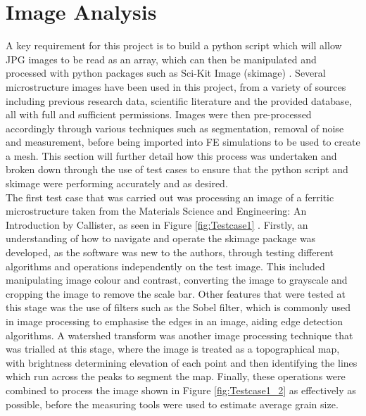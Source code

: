 \documentclass[\report.tex]{subfiles}
\begin{document}
\section{Image Analysis}
\noindent A key requirement for this project is to build a python script which will allow JPG images to be read as an array, which can then be manipulated and processed with python packages such as Sci-Kit Image (skimage) \cite{scikitimage}. Several microstructure images have been used in this project, from a variety of sources including previous research data, scientific literature and the provided database, all with full and sufficient permissions. Images were then pre-processed accordingly through various techniques such as segmentation, removal of noise and measurement, before being imported into FE simulations to be used to create a mesh. This section will further detail how this process was undertaken and broken down through the use of test cases to ensure that the python script and skimage were performing accurately and as desired.\\

\noindent The first test case that was carried out was processing an image of a ferritic microstructure taken from the Materials Science and Engineering: An Introduction by Callister, as seen in Figure \ref{fig:Testcase1} \cite{CallisterJrWilliamD2000MSaE}.
Firstly, an understanding of how to navigate and operate the skimage package was developed, as the software was new to the authors, through testing different algorithms and operations independently on the test image. This included manipulating image colour and contrast, converting the image to grayscale and cropping the image to remove the scale bar. Other features that were tested at this stage was the use of filters such as the Sobel filter, which is commonly used in image processing to emphasise the edges in an image, aiding edge detection algorithms.
A watershed transform was another image processing technique that was trialled at this stage, where the image is treated as a topographical map, with brightness determining elevation of each point and then identifying the lines which run across the peaks to segment the map. Finally, these operations were combined to process the image shown in Figure \ref{fig:Testcase1_2} as effectively as possible, before the measuring tools were used to estimate average grain size.\\
\end{document}
